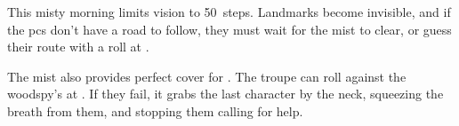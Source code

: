 \woodspy


This misty morning limits vision to 50~\glspl{step}.
Landmarks become invisible, and if the \glspl{pc} don't have a road to follow, they must wait  for the mist to clear, or guess their route with a  roll at \tn[10].

The mist also provides perfect cover for .
The troupe can roll  against the \gls{woodspy}'s  at \tn.
If they fail, it grabs the last character by the neck, squeezing the breath from them, and stopping them calling for help.

